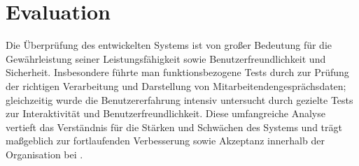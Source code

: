 \chapter{Evaluation}
\label{chap:evaluation}

Die Überprüfung des entwickelten Systems ist von großer Bedeutung für die Gewährleistung seiner Leistungsfähigkeit sowie Benutzerfreundlichkeit und Sicherheit. Insbesondere führte man funktionsbezogene Tests durch zur Prüfung der richtigen Verarbeitung und Darstellung von Mitarbeitendengesprächsdaten; gleichzeitig wurde die Benutzererfahrung intensiv untersucht durch gezielte Tests zur Interaktivität und Benutzerfreundlichkeit. Diese umfangreiche Analyse vertieft das Verständnis für die Stärken und Schwächen des Systems und trägt maßgeblich zur fortlaufenden Verbesserung sowie Akzeptanz innerhalb der Organisation bei \cite{akinnuwesi2012framework, achter2016bigdata, angrave2016hr}.

\begin{table}[h!]
\centering
\renewcommand{\arraystretch}{1.5} %
\setlength{\tabcolsep}{8pt} %
\caption{Vergleich der Erfüllungsgrade zwischen dem entwickelten System, HRworks und Evalea}
\label{tab:vergleich_systeme}
\end{table}

